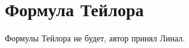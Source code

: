 
\section{Формула Тейлора}

\begin{normalsize}
    Формулы Тейлора не будет, автор принял Линал.
\end{normalsize}